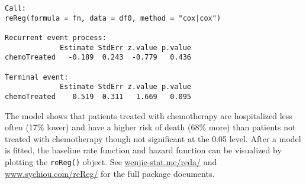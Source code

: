 \begin{Shaded}
\begin{Highlighting}[]
\StringTok{ } \NormalTok{); }
\end{Highlighting}
\end{Shaded}

\begin{verbatim}
Call: 
reReg(formula = fn, data = df0, method = "cox|cox")

Recurrent event process:
             Estimate StdErr z.value p.value
chemoTreated   -0.189  0.243  -0.779   0.436

Terminal event:
             Estimate StdErr z.value p.value
chemoTreated    0.519  0.311   1.669   0.095
\end{verbatim}

The model shows that patients treated with chemotherapy are hospitalized
less often (17\% lower) and have a higher risk of death (68\% more) than
patients not treated with chemotherapy though not significant at the
0.05 level. After a model is fitted, the baseline rate function and
hazard function can be visualized by plotting the \texttt{reReg()}
object. See \url{wenjie-stat.me/reda/} and \url{www.sychiou.com/reReg/}
for the full package documents.
